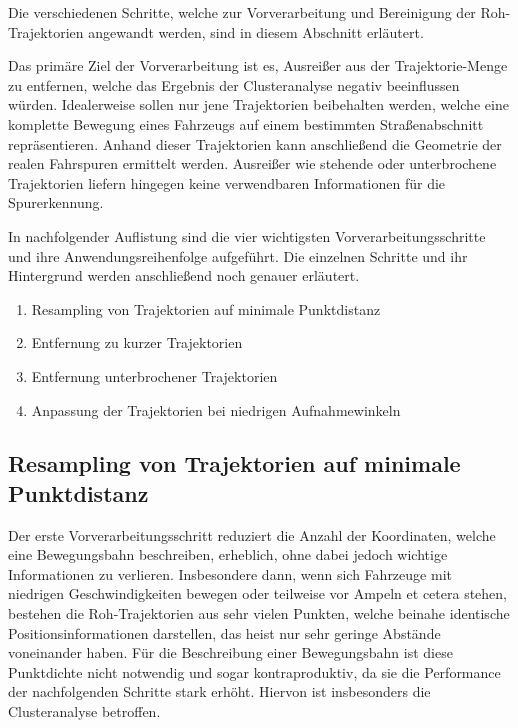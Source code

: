 Die verschiedenen Schritte, welche zur Vorverarbeitung und Bereinigung der Roh-Trajektorien angewandt werden,
sind in diesem Abschnitt erläutert.

Das primäre Ziel der Vorverarbeitung ist es, Ausreißer aus der
Trajektorie-Menge zu entfernen, welche das Ergebnis der Clusteranalyse negativ beeinflussen würden.
Idealerweise sollen nur jene Trajektorien beibehalten werden, welche eine komplette Bewegung eines
Fahrzeugs auf einem bestimmten Straßenabschnitt repräsentieren. Anhand dieser Trajektorien kann
anschließend die Geometrie der realen Fahrspuren ermittelt werden. Ausreißer wie stehende oder unterbrochene Trajektorien
liefern hingegen keine verwendbaren Informationen für die Spurerkennung.

In nachfolgender Auflistung sind die vier wichtigsten Vorverarbeitungsschritte und ihre Anwendungsreihenfolge
aufgeführt. Die einzelnen Schritte und ihr Hintergrund werden anschließend noch genauer erläutert.

\begin{enumerate}
    \item Resampling von Trajektorien auf minimale Punktdistanz
    \item Entfernung zu kurzer Trajektorien
    \item Entfernung unterbrochener Trajektorien
    \item Anpassung der Trajektorien bei niedrigen Aufnahmewinkeln
\end{enumerate}

\subsection{Resampling von Trajektorien auf minimale Punktdistanz}
Der erste Vorverarbeitungsschritt reduziert die Anzahl der Koordinaten, welche eine Bewegungsbahn beschreiben, erheblich,
ohne dabei jedoch wichtige Informationen zu verlieren. Insbesondere dann, wenn sich Fahrzeuge mit niedrigen
Geschwindigkeiten bewegen oder teilweise vor Ampeln et cetera stehen, bestehen die Roh-Trajektorien aus sehr vielen
Punkten, welche beinahe identische Positionsinformationen darstellen, das heist nur sehr geringe
Abstände voneinander haben. Für die Beschreibung einer Bewegungsbahn ist diese Punktdichte nicht notwendig
und sogar kontraproduktiv, da sie die Performance der nachfolgenden Schritte stark erhöht. Hiervon ist insbesonders
die Clusteranalyse betroffen.

